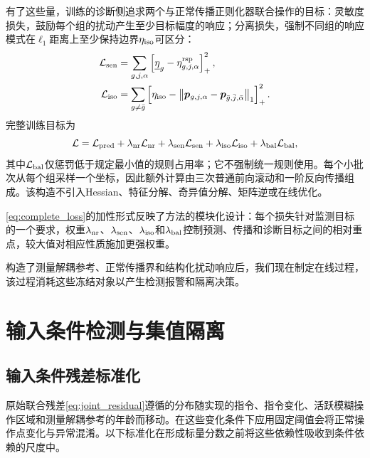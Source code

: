 \documentclass[journal]{IEEEtran}
\newcommand{\norm}[1]{\left\lVert #1\right\rVert}
\newcommand{\1}{\bm 1}
\begin{document}
有了这些量，训练的诊断侧追求两个与正常传播正则化器联合操作的目标：灵敏度损失，鼓励每个组的扰动产生至少目标幅度的响应；分离损失，强制不同组的响应模式在$\ell_1$距离上至少保持边界$\eta_{\rm iso}$可区分：
\begin{equation}
\begin{aligned}
\mathcal L_{\rm sen}
&=\sum_{g,j,\alpha}
\left[\underline{\eta}_g-\eta_{g,j,\alpha}^{\rm rsp}\right]_+^2,\\
\mathcal L_{\rm iso}
&=\sum_{g\ne\bar g}
\left[
\eta_{\rm iso}
-\norm{\bm p_{g,j,\alpha}
-\bm p_{\bar g,\bar j,\bar\alpha}}_1
\right]_+^2.
\end{aligned}
\label{eq:response_losses}
\end{equation}
完整训练目标为
\begin{equation}
\mathcal L=
\mathcal L_{\rm pred}
+\lambda_{\rm nr}\mathcal L_{\rm nr}
+\lambda_{\rm sen}\mathcal L_{\rm sen}
+\lambda_{\rm iso}\mathcal L_{\rm iso}
+\lambda_{\rm bal}\mathcal L_{\rm bal},
\label{eq:complete_loss}
\end{equation}
其中$\mathcal L_{\rm bal}$仅惩罚低于规定最小值的规则占用率；它不强制统一规则使用。每个小批次从每个组采样一个坐标，因此额外计算由三次普通前向滚动和一阶反向传播组成。该构造不引入Hessian、特征分解、奇异值分解、矩阵逆或在线优化。

\eqref{eq:complete_loss}的加性形式反映了方法的模块化设计：每个损失针对监测目标的一个要求，权重$\lambda_{\rm nr}$、$\lambda_{\rm sen}$、$\lambda_{\rm iso}$和$\lambda_{\rm bal}$控制预测、传播和诊断目标之间的相对重点，较大值对相应性质施加更强权重。

构造了测量解耦参考、正常传播界和结构化扰动响应后，我们现在制定在线过程，该过程消耗这些冻结对象以产生检测报警和隔离决策。

\section{输入条件检测与集值隔离}
\subsection{输入条件残差标准化}
原始联合残差\eqref{eq:joint_residual}遵循的分布随实现的指令、指令变化、活跃模糊操作区域和测量解耦参考的年龄而移动。在这些变化条件下应用固定阈值会将正常操作点变化与异常混淆。以下标准化在形成标量分数之前将这些依赖性吸收到条件依赖的尺度中。
\end{document}
